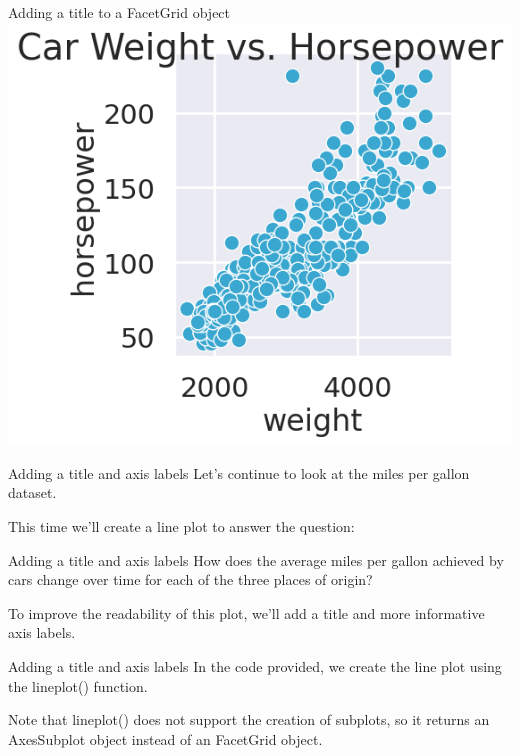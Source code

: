 \documentclass[
  ignorenonframetext,
]{beamer}
\begin{document}
\begin{frame}{Adding a title to a FacetGrid object}
\label{adding-a-title-to-a-facetgrid-object-3}
\includegraphics{../images/im305.png}
\end{frame}

\begin{frame}{Adding a title and axis labels}
\label{adding-a-title-and-axis-labels}
Let's continue to look at the miles per gallon dataset.

This time we'll create a line plot to answer the question:
\end{frame}

\begin{frame}{Adding a title and axis labels}
\label{adding-a-title-and-axis-labels-1}
How does the average miles per gallon achieved by cars change over time
for each of the three places of origin?

To improve the readability of this plot, we'll add a title and more
informative axis labels.
\end{frame}

\begin{frame}{Adding a title and axis labels}
\label{adding-a-title-and-axis-labels-2}
In the code provided, we create the line plot using the lineplot()
function.

Note that lineplot() does not support the creation of subplots, so it
returns an AxesSubplot object instead of an FacetGrid object.
\end{frame}
\end{document}
